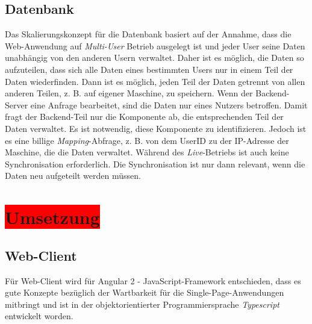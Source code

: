 \subsection{Datenbank}

Das Skalierungskonzept für die Datenbank basiert auf der Annahme, dass die Web-Anwendung auf \textit{Multi-User} Betrieb ausgelegt ist und jeder User seine Daten unabhängig von den anderen Usern verwaltet. Daher ist es möglich, die Daten so aufzuteilen, dass sich alle Daten eines bestimmten Users nur in einem Teil der Daten wiederfinden. Dann ist es möglich, jeden Teil der Daten getrennt von allen anderen Teilen, z. B. auf eigener Maschine, zu speichern. Wenn der Backend-Server eine Anfrage bearbeitet, sind die Daten nur eines Nutzers betroffen. Damit fragt der Backend-Teil nur die Komponente ab, die entsprechenden Teil der Daten verwaltet. Es ist notwendig, diese Komponente zu identifizieren. Jedoch ist es eine billige \textit{Mapping}-Abfrage, z. B. von dem UserID zu der IP-Adresse der Maschine, die die Daten verwaltet. Während des \textit{Live}-Betriebs ist auch keine Synchronisation erforderlich. Die Synchronisation ist nur dann relevant, wenn die Daten neu aufgeteilt werden müssen.

\section{\colorbox{red}{Umsetzung}}

\subsection{Web-Client}

Für Web-Client wird für Angular 2 - JavaScript-Framework entschieden, dass es gute Konzepte bezüglich der Wartbarkeit für die Single-Page-Anwendungen mitbringt und ist in der objektorientierter Programmiersprache \textit{Typescript} entwickelt worden. 

